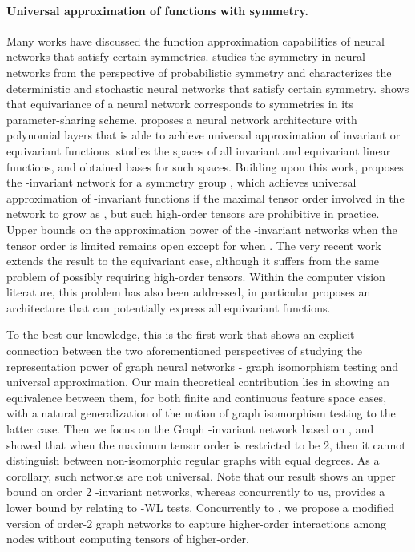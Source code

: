 \documentclass{article}
\begin{document}
\paragraph{Universal approximation of functions with symmetry.} Many works have discussed the function approximation capabilities of neural networks that satisfy certain symmetries.
\cite{bloemreddy2019probabilistic} studies the symmetry in neural networks from the perspective of probabilistic symmetry and characterizes the deterministic and stochastic neural networks that satisfy certain symmetry. \cite{ravanbakhsh2017sharing} shows that equivariance of a neural network corresponds to symmetries in its parameter-sharing scheme. \cite{yarotsky2018universal} proposes a neural network architecture with polynomial layers that is able to achieve universal approximation of invariant or equivariant functions.  
\cite{maron2018invariant} studies the spaces of all invariant and equivariant linear functions, and obtained bases for such spaces. Building upon this work, \cite{maron2019universality} proposes the -invariant network for a symmetry group , which achieves universal approximation of -invariant functions if the maximal tensor order involved in the network to grow as , but such high-order tensors are prohibitive in practice. Upper bounds on the approximation power of the -invariant networks when the tensor order is limited remains open except for when  \cite{maron2019universality}. The very recent work \cite{keriven2019universal} extends the result to the equivariant case, although it suffers from the same problem of possibly requiring high-order tensors. Within the computer vision literature, this problem has also been addressed, in particular \cite{herzig2018mapping} proposes an architecture that can potentially express all equivariant functions.

To the best our knowledge, this is the first work that shows an explicit connection between the two aforementioned perspectives of studying the representation power of graph neural networks - graph isomorphism testing and universal approximation. Our main theoretical contribution lies in showing an equivalence between them, for both finite and continuous feature space cases, with a natural generalization of the notion of graph isomorphism testing to the latter case. Then we focus on the Graph -invariant network based on \cite{maron2018invariant,maron2019universality}, and showed that when the maximum tensor order is restricted to be 2, then it cannot distinguish between non-isomorphic regular graphs with equal degrees. As a corollary, such networks are not universal. Note that our result shows an upper bound on order 2 -invariant networks, whereas concurrently to us, \cite{maron2019provably} provides a lower bound by relating to -WL tests. Concurrently to \cite{maron2019provably}, we propose a modified version of order-2 graph networks to capture higher-order interactions among nodes without computing tensors of higher-order.
\end{document}
